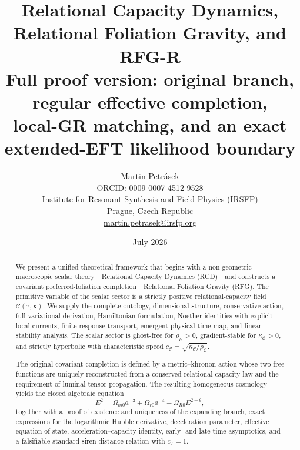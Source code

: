 \documentclass[11pt,a4paper]{article}
\title{\textbf{Relational Capacity Dynamics, Relational Foliation Gravity, and RFG-R}\\[0.4em]
\large Full proof version: original branch, regular effective completion,\\ local-GR matching, and an exact extended-EFT likelihood boundary}
\author{Martin Petr\'{a}sek\\[0.3em]
\small ORCID: \href{https://orcid.org/0009-0007-4512-9528}{0009-0007-4512-9528}\\[0.2em]
\small Institute for Resonant Synthesis and Field Physics (IRSFP)\\
\small Prague, Czech Republic\\
\small \href{mailto:martin.petrasek@irsfp.org}{martin.petrasek@irsfp.org}}
\date{July 2026}
\newcommand{\C}{\mathcal{C}}
\newcommand{\rhoC}{\rho_{\mathcal{C}}}
\newcommand{\kC}{\kappa_{\mathcal{C}}}
\begin{document}
\maketitle

\begin{abstract}
We present a unified theoretical framework that begins with a non-geometric macroscopic scalar theory---Relational Capacity Dynamics (RCD)---and constructs a covariant preferred-foliation completion---Relational Foliation Gravity (RFG). The primitive variable of the scalar sector is a strictly positive relational-capacity field \(\C(\tau,\mathbf{x})\). We supply the complete ontology, dimensional structure, conservative action, full variational derivation, Hamiltonian formulation, Noether identities with explicit local currents, finite-response transport, emergent physical-time map, and linear stability analysis. The scalar sector is ghost-free for \(\rhoC>0\), gradient-stable for \(\kC>0\), and strictly hyperbolic with characteristic speed \(c_{\mathcal{C}}=\sqrt{\kC/\rhoC}\).

The original covariant completion is defined by a metric--khronon action whose two free functions are uniquely reconstructed from a conserved relational-capacity law and the requirement of luminal tensor propagation. The resulting homogeneous cosmology yields the closed algebraic equation
\[
E^2=\Omega_{m0}a^{-3}+\Omega_{r0}a^{-4}+\Omega_{R0}E^{2-\theta},
\]
together with a proof of existence and uniqueness of the expanding branch, exact expressions for the logarithmic Hubble derivative, deceleration parameter, effective equation of state, acceleration--capacity identity, early- and late-time asymptotics, and a falsifiable standard-siren distance relation with \(c_T=1\).


\end{abstract}
\end{document}

